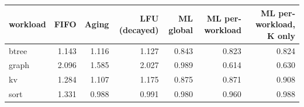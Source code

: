 \begin{tabular}{lrrrrrr}
\toprule
workload & FIFO & Aging & LFU (decayed) & ML global & ML per-workload & ML per-workload, K only \\
\midrule
btree & 1.143 & 1.116 & 1.127 & 0.843 & 0.823 & 0.824 \\
graph & 2.096 & 1.585 & 2.027 & 0.989 & 0.614 & 0.630 \\
kv & 1.284 & 1.107 & 1.175 & 0.875 & 0.871 & 0.908 \\
sort & 1.331 & 0.988 & 0.991 & 0.980 & 0.960 & 0.988 \\
\bottomrule
\end{tabular}
